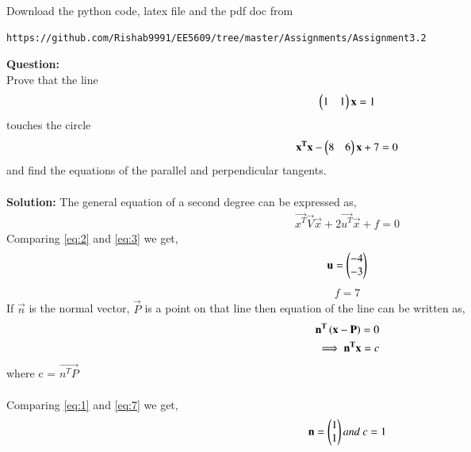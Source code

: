 \documentclass[journal,12pt,twocolumn]{IEEEtran}
\begin{document}
%
Download the python code, latex file and the pdf doc from 
\begin{lstlisting}
https://github.com/Rishab9991/EE5609/tree/master/Assignments/Assignment3.2
\end{lstlisting}
\textbf{Question:}\\
Prove that the line
\begin{align}
\begin{pmatrix}1 & 1\end{pmatrix}\mathbf{x} = 1 \label{eq:1}
\end{align}
touches the circle
\begin{align}
\mathbf{x^T}\mathbf{x} - \begin{pmatrix}8 & 6\end{pmatrix}\mathbf{x} + 7 = 0 \label{eq:2}    
\end{align}
and find the equations of the parallel and perpendicular tangents.\\\\
\textbf{Solution:}
The general equation of a second degree can be expressed as,
\begin{align}
\vec{x^T}\vec{V}\vec{x} + 2\vec{u^T}\vec{x} + f = 0 \label{eq:3}
\end{align}
Comparing \eqref{eq:2} and \eqref{eq:3} we get,
\begin{align}
\mathbf{u} = \begin{pmatrix}-4 \\ -3\end{pmatrix} \label{eq:4}
\end{align}
\begin{align}
f = 7 \label{eq:5}    
\end{align}
If $\vec{n}$ is the normal vector, $\vec{P}$ is a point on that line then equation of the line can be written as,
\begin{align}
\mathbf{n^T}\left(\mathbf{x-P}\right) = 0\\
\implies \mathbf{n^Tx} = c \label{eq:7}
\end{align}
 where c = $\vec{n^TP}$\\\\
Comparing \eqref{eq:1} and \eqref{eq:7} we get,
\begin{align}
\mathbf{n} = \begin{pmatrix}1 \\ 1\end{pmatrix} and \ c = 1 \label{eq:8}
\end{align}\\
\end{document}
